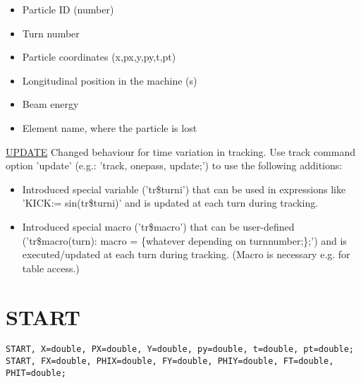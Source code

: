 \begin{itemize}
   \item Particle ID (number)
   \item Turn number
   \item Particle coordinates (x,px,y,py,t,pt)
   \item Longitudinal position in the machine (s)
   \item Beam energy
   \item Element name, where the particle is lost
\end{itemize}
          
\href{track:remarks:update:notes}{UPDATE}
Changed behaviour for time variation in tracking. Use
track command option 'update' (e.g.: 'track, onepass,
update;') to use the following additions: 

\begin{itemize}
   \item  Introduced special variable ('tr\$turni') that can be
     used in expressions like 'KICK:= sin(tr\$turni)' and is updated at
     each turn during tracking. 
     
   \item  Introduced special macro ('tr\$macro') that can be
     user-defined ('tr\$macro(turn): macro = \{whatever
     depending on turnnumber;\};') and is executed/updated at each turn
     during tracking. (Macro is necessary e.g. for table access.)
     
\end{itemize}

\section{START}          
\begin{verbatim}
START, X=double, PX=double, Y=double, py=double, t=double, pt=double;
START, FX=double, PHIX=double, FY=double, PHIY=double, FT=double, PHIT=double;  
\end{verbatim}
          

